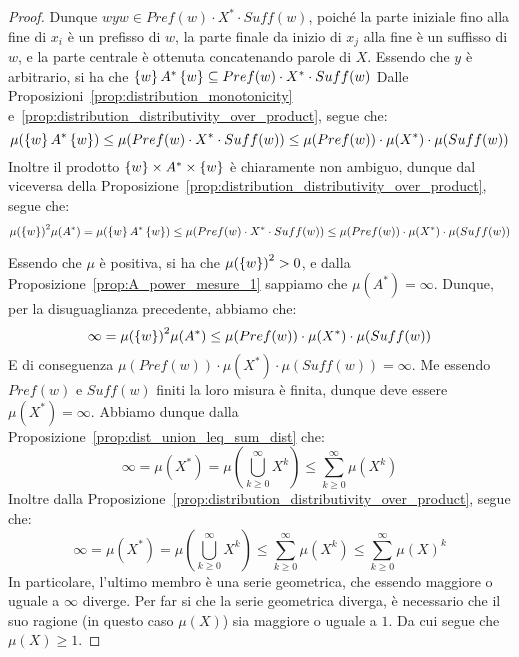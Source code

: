 \begin{proof}
  Dunque \(wyw \in Pref(w)\cdot X^* \cdot Suff(w)\), poiché la parte iniziale fino alla fine di \(x_i\) è un prefisso di \(w\), la parte finale da inizio di \(x_j\) alla fine è un suffisso di \(w\), e la parte centrale è ottenuta concatenando parole di \(X\).
  Essendo che \(y\) è arbitrario, si ha che \(\set{w}A^*\set{w} \subseteq Pref(w)\cdot X^* \cdot Suff(w)\)
  Dalle Proposizioni~\ref{prop:distribution_monotonicity} e~\ref{prop:distribution_distributivity_over_product}, segue che:
  \[\mu(\set{w}A^*\set{w}) \leq \mu(Pref(w)\cdot X^* \cdot Suff(w)) \leq \mu(Pref(w))\cdot \mu(X^*)\cdot \mu(Suff(w))\]
  Inoltre il prodotto \(\set{w}\times A^* \times \set{w}\) è chiaramente non ambiguo, dunque dal viceversa della Proposizione~\ref{prop:distribution_distributivity_over_product}, segue che:
  \[{\mu(\set{w})}^2\mu(A^*)=\mu(\set{w}A^*\set{w}) \leq \mu(Pref(w)\cdot X^* \cdot Suff(w)) \leq \mu(Pref(w))\cdot \mu(X^*)\cdot \mu(Suff(w))\]

  Essendo che \(\mu\) è positiva, si ha che \({\mu(\set{w})}^2 > 0\), e dalla Proposizione~\ref{prop:A_power_mesure_1} sappiamo che \(\mu(A^*) = \infty\).
  Dunque, per la disuguaglianza precedente, abbiamo che:
  \[\infty = {\mu(\set{w})}^2\mu(A^*) \leq \mu(Pref(w))\cdot \mu(X^*)\cdot \mu(Suff(w))\]
  E di conseguenza \(\mu(Pref(w))\cdot \mu(X^*)\cdot \mu(Suff(w)) = \infty\).
  Me essendo \(Pref(w)\) e \(Suff(w)\) finiti la loro misura è finita, dunque deve essere \(\mu(X^*) = \infty\).
  Abbiamo dunque dalla Proposizione~\ref{prop:dist_union_leq_sum_dist} che:
  \[\infty = \mu(X^*) = \mu(\bigcup_{k \geq 0}^{\infty} X^k) \leq \sum_{k \geq 0}^{\infty} \mu(X^k)\]
  Inoltre dalla Proposizione~\ref{prop:distribution_distributivity_over_product}, segue che:
  \[\infty = \mu(X^*) = \mu(\bigcup_{k \geq 0}^{\infty} X^k) \leq \sum_{k \geq 0}^{\infty} \mu(X^k)\leq \sum_{k \geq 0}^{\infty} {\mu(X)}^k\]
  In particolare, l'ultimo membro è una serie geometrica, che essendo maggiore o uguale a \(\infty\) diverge.
  Per far si che la serie geometrica diverga, è necessario che il suo ragione (in questo caso \(\mu(X)\)) sia maggiore o uguale a \(1\).
  Da cui segue che \(\mu(X) \geq 1\).
\end{proof}


